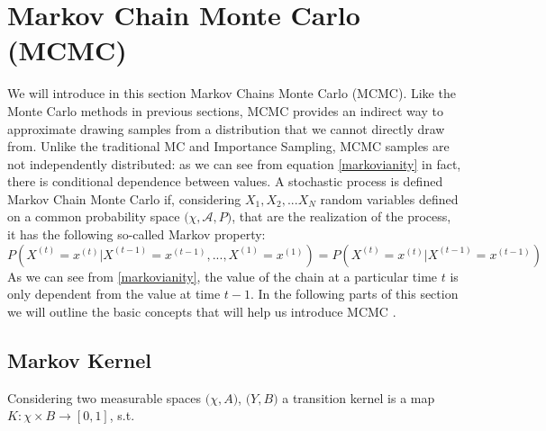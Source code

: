 \documentclass[12pt,mythesisstyle]{report}
\begin{document}
\section{Markov Chain Monte Carlo (MCMC)}\label{section: mcmc}
\begin{comment}
LEO: IN THIS INTRODUCTORY PART PUT ALL TH STEPS TO SHOW THAT THE MCMC CONVERGES TO F: WE WANT TO DRAW SAMPLES FROM F AND WE'LL DO WITH KERNEL AND PROPOSAL
LEO: PUT IN THE BEGINNING WHAT URE GOING TO DO: WELL DEMONSTRATE HOW TO THIS AND THAT, AND THAT SAMPLES ARE TAKEN ETC ETC
LEO: RENAME PI AS F AND POSSIBLY THE X AS THETA
LEO : UNCERTAINTY OF THE MCMC
LEO: FROM SLIDE 27 GANDY TAKE ERGODICITY OF MH
\end{comment}
We will introduce in this section Markov Chains Monte Carlo (MCMC). Like the Monte Carlo methods in previous sections, MCMC provides an indirect way to approximate drawing samples from a distribution that we cannot directly draw from. Unlike the traditional MC and Importance Sampling, MCMC samples are not independently distributed: as we can see from equation \eqref{markovianity} in fact, there is conditional dependence between values. A stochastic process is defined Markov Chain Monte Carlo if, considering $X_1, X_2, ...X_N$ random variables defined on a common probability space $\big(\chi, \mathcal{A}, P\big)$, that are the realization of the process, it has the following so-called Markov property:
\begin{equation}\label{markovianity}
P(X^{(t)}=x^{(t)}|X^{(t-1)}=x^{(t-1)},...,X^{(1)}=x^{(1)})=P(X^{(t)}=x^{(t)}|X^{(t-1)}=x^{(t-1)})
\end{equation}
As we can see from  \eqref{markovianity}, the value of the chain at a particular time $t$ is only dependent from the value at time $t-1$. In the following parts of this section we will outline the basic concepts that will help us introduce MCMC \cite{RobertCasella}.

\subsection{Markov Kernel}\label{section:Markovkernels}
Considering two measurable spaces $\big(\chi, A\big)$, $\big(Y, B\big)$ a transition kernel is a map \cite{RobertCasella}  $K:\chi \times B\rightarrow [0,1]$, s.t.

\begin{comment}
LEO: DEFINE THE PROBABILITY MEASURE P SOMEWHERE
\end{comment}
\end{document}

